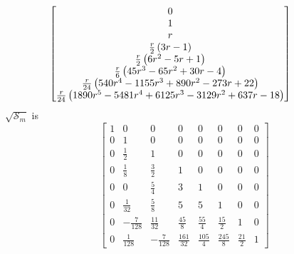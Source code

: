 \begin{displaymath}
\hspace{-1cm}
\left[\begin{matrix} 0 \\ 1 \\ r \\ \frac{r}{2} \left(3 r - 1\right) \\ \frac{r}{2} \left(6 r^{2} - 5 r + 1\right) \\ \frac{r}{6} \left(45 r^{3} - 65 r^{2} + 30 r - 4\right) \\ \frac{r}{24} \left(540 r^{4} - 1155 r^{3} + 890 r^{2} - 273 r + 22\right) \\ \frac{r}{24} \left(1890 r^{5} - 5481 r^{4} + 6125 r^{3} - 3129 r^{2} + 637 r - 18\right) \end{matrix}\right]
\end{displaymath}
$\sqrt{\mathcal{S}_{m}}$ is
\begin{displaymath}
\left[\begin{matrix}1 & 0 & 0 & 0 & 0 & 0 & 0 & 0\\0 & 1 & 0 & 0 & 0 & 0 & 0 & 0\\0 & \frac{1}{2} & 1 & 0 & 0 & 0 & 0 & 0\\0 & \frac{1}{8} & \frac{3}{2} & 1 & 0 & 0 & 0 & 0\\0 & 0 & \frac{5}{4} & 3 & 1 & 0 & 0 & 0\\0 & \frac{1}{32} & \frac{5}{8} & 5 & 5 & 1 & 0 & 0\\0 & - \frac{7}{128} & \frac{11}{32} & \frac{45}{8} & \frac{55}{4} & \frac{15}{2} & 1 & 0\\0 & \frac{1}{128} & - \frac{7}{128} & \frac{161}{32} & \frac{105}{4} & \frac{245}{8} & \frac{21}{2} & 1\end{matrix}\right]
\end{displaymath}
